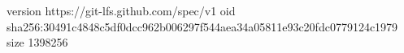 version https://git-lfs.github.com/spec/v1
oid sha256:30491c4848c5df0dcc962b006297f544aea34a05811e93c20fdc0779124c1979
size 1398256
